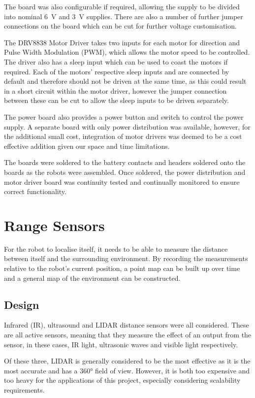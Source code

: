 The board was also configurable if required, allowing the supply to be
divided into nominal \SI{6}{\volt} and \SI{3}{\volt} supplies. There are also a number of further jumper
connections on the board which can be cut for further voltage customisation.

The DRV8838 Motor Driver takes two inputs for each motor for direction and Pulse
Width Modulation (PWM), which allows the motor speed to be controlled. The
driver also has a sleep input which can be used to coast the motors if
required. Each of the motors' respective sleep inputs
and are connected by default and therefore should not be driven at the same time,
as this could result in a short circuit within the motor driver, however the
jumper connection between these can be cut to allow the sleep inputs to
be driven separately.

The power board also provides a power button and switch to control the
power supply. A separate board with only power distribution was
available, however, for the additional small cost, integration of
motor drivers was deemed to be a cost effective addition given our
space and time limitations.

The boards were soldered to the battery contacts and headers soldered
onto the boards as the robots were assembled. Once soldered, the power
distribution and motor driver board was continuity tested and continually monitored to ensure correct functionality.

\section{Range Sensors}\label{elec/range}
For the robot to localise itself, it needs to be able to measure the
distance between itself and the surrounding environment. By recording
the measurements relative to the robot's current position, a point map
can be built up over time and a general map of the environment can be
constructed.

\subsection{Design}\label{elec/range/design}
Infrared (IR), ultrasound and LIDAR distance sensors were all considered. These
are all active sensors, meaning that they measure the effect of an
output from the sensor, in these cases, IR light, ultrasonic waves
and visible light respectively.

Of these three, LIDAR is generally considered to be the most effective
as it is the most accurate and has a \ang{360} field of view. However,
it is both too expensive and too heavy for the applications of this project, especially
considering scalability requirements.

